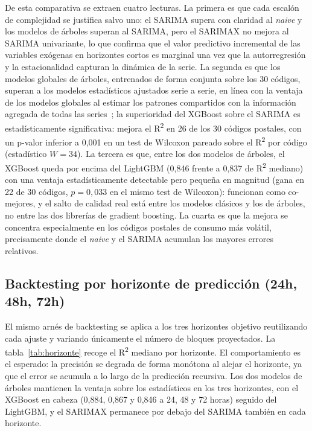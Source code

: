 \documentclass[12pt, a4paper]{article}
\begin{document}
De esta comparativa se extraen cuatro lecturas. La primera es que cada escalón de complejidad se justifica salvo uno: el SARIMA supera con claridad al \textit{naive} y los modelos de árboles superan al SARIMA, pero el SARIMAX no mejora al SARIMA univariante, lo que confirma que el valor predictivo incremental de las variables exógenas en horizontes cortos es marginal una vez que la autorregresión y la estacionalidad capturan la dinámica de la serie. La segunda es que los modelos globales de árboles, entrenados de forma conjunta sobre los 30 códigos, superan a los modelos estadísticos ajustados serie a serie, en línea con la ventaja de los modelos globales al estimar los patrones compartidos con la información agregada de todas las series~\cite{montero2021}; la superioridad del XGBoost sobre el SARIMA es estadísticamente significativa: mejora el R\textsuperscript{2} en 26 de los 30 códigos postales, con un p-valor inferior a 0,001 en un test de Wilcoxon pareado sobre el R\textsuperscript{2} por código (estadístico $W=34$). La tercera es que, entre los dos modelos de árboles, el XGBoost queda por encima del LightGBM (0,846 frente a 0,837 de R\textsuperscript{2} mediano) con una ventaja estadísticamente detectable pero pequeña en magnitud (gana en 22 de 30 códigos, $p=0{,}033$ en el mismo test de Wilcoxon): funcionan como co-mejores, y el salto de calidad real está entre los modelos clásicos y los de árboles, no entre las dos librerías de gradient boosting. La cuarta es que la mejora se concentra especialmente en los códigos postales de consumo más volátil, precisamente donde el \textit{naive} y el SARIMA acumulan los mayores errores relativos.

\subsection{Backtesting por horizonte de predicción (24h, 48h, 72h)}

El mismo arnés de backtesting se aplica a los tres horizontes objetivo reutilizando cada ajuste y variando únicamente el número de bloques proyectados. La tabla~\ref{tab:horizonte} recoge el R\textsuperscript{2} mediano por horizonte. El comportamiento es el esperado: la precisión se degrada de forma monótona al alejar el horizonte, ya que el error se acumula a lo largo de la predicción recursiva. Los dos modelos de árboles mantienen la ventaja sobre los estadísticos en los tres horizontes, con el XGBoost en cabeza (0,884, 0,867 y 0,846 a 24, 48 y 72 horas) seguido del LightGBM, y el SARIMAX permanece por debajo del SARIMA también en cada horizonte.
\end{document}
